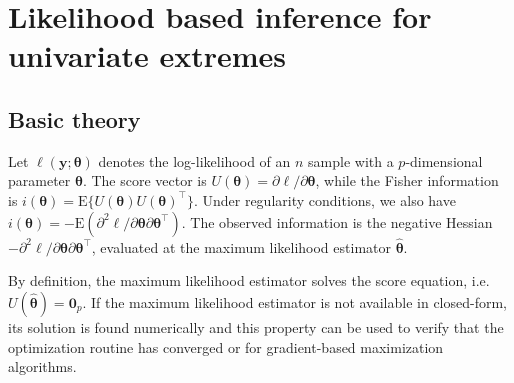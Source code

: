 \documentclass[]{book}
\begin{document}
\newcommand{\bs}[1]{\boldsymbol{#1}}
\newcommand{\Hmat}{\mathbf{H}}
\newcommand{\Mmat}{\mathbf{M}}
\newcommand{\mX}{\mathbf{X}}
\newcommand{\bX}{{\mathbf{X}}}
\newcommand{\bx}{{\mathbf{x}}}
\newcommand{\by}{{\boldsymbol{y}}}
\newcommand{\bY}{{\boldsymbol{Y}}}
\newcommand{\eps}{\varepsilon}
\newcommand{\beps}{\boldsymbol{\varepsilon}}
\newcommand{\bbeta}{\boldsymbol{\beta}}
\newcommand{\hbb}{\hat{\boldsymbol{\beta}}}
\newcommand{\limni}{\lim_{n \ra \infty}}
\newcommand{\Sp}{\mathscr{S}}
\newcommand{\E}[2][]{{\mathsf E}_{#1}\left(#2\right)}
\newcommand{\Va}[2][]{{\mathsf{Var}_{#1}}\left(#2\right)}
\newcommand{\I}[1]{{\mathbf 1}_{#1}}
\newcommand{\R}{\mathbb{R}}
\newcommand{\N}{\mathbb{N}}
\newcommand{\Cn}{\textsf{No}}
\newcommand{\simiid}{\stackrel{\mathrm{iid}}{\sim}}
\newcommand{\bigO}{\mathrm{O}}
\newcommand{\rp}{\mathrm{p}}
\newcommand{\Hy}{\mathrm{H}}
\renewcommand{\d}{\mathrm{d}}
\newcommand{\sphere}{\mathbb{S}}
\newcommand{\ang}{\mathrm{ang}}
\newcommand{\Ri}{\mathcal{R}}
\newcommand{\cone}{\mathcal{C}}

\hypertarget{likelihood-based-inference-for-univariate-extremes}{%
\chapter{Likelihood based inference for univariate extremes}\label{likelihood-based-inference-for-univariate-extremes}}

\hypertarget{basic-theory}{%
\section{Basic theory}\label{basic-theory}}

Let \(\ell(\boldsymbol{y}; \boldsymbol{\theta})\) denotes the log-likelihood of an \(n\) sample with a \(p\)-dimensional parameter \(\boldsymbol{\theta}\). The score vector is \(U(\boldsymbol{\theta})=\partial \ell / \partial \boldsymbol{\theta}\), while the Fisher information is \(i(\boldsymbol{\theta})=\mathrm{E}\{U(\boldsymbol{\theta})U(\boldsymbol{\theta})^\top\}\). Under regularity conditions, we also have \(i(\boldsymbol{\theta}) = - \mathrm{E}(\partial^2 \ell / \partial \boldsymbol{\theta}\partial \boldsymbol{\theta}^\top)\). The observed information is the negative Hessian \(-\partial^2 \ell / \partial \boldsymbol{\theta}\partial \boldsymbol{\theta}^\top\), evaluated at the maximum likelihood estimator \(\hat{\boldsymbol{\theta}}\).

By definition, the maximum likelihood estimator solves the score equation, i.e.~\(U(\hat{\boldsymbol{\theta}})=\boldsymbol{0}_p\). If the maximum likelihood estimator is not available in closed-form, its solution is found numerically and this property can be used to verify that the optimization routine has converged or for gradient-based maximization algorithms.
\end{document}
